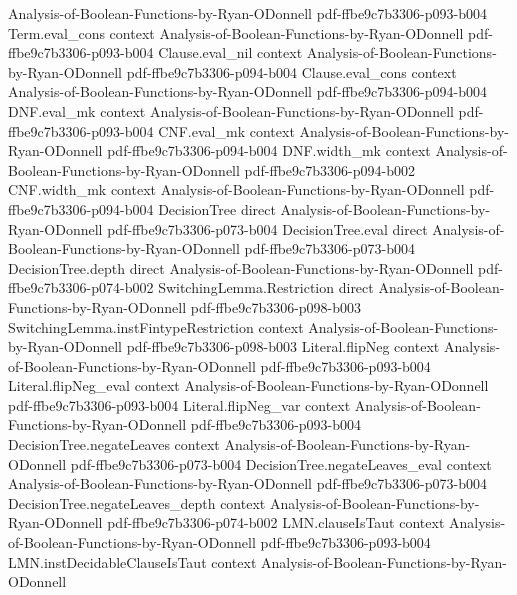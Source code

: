 \begin{theorem}
  {Analysis-of-Boolean-Functions-by-Ryan-ODonnell}
  {pdf-ffbe9c7b3306-p093-b004}
\proofstep
  {Term.eval_cons}
  {context}
  {Analysis-of-Boolean-Functions-by-Ryan-ODonnell}
  {pdf-ffbe9c7b3306-p093-b004}
\proofstep
  {Clause.eval_nil}
  {context}
  {Analysis-of-Boolean-Functions-by-Ryan-ODonnell}
  {pdf-ffbe9c7b3306-p094-b004}
\proofstep
  {Clause.eval_cons}
  {context}
  {Analysis-of-Boolean-Functions-by-Ryan-ODonnell}
  {pdf-ffbe9c7b3306-p094-b004}
\proofstep
  {DNF.eval_mk}
  {context}
  {Analysis-of-Boolean-Functions-by-Ryan-ODonnell}
  {pdf-ffbe9c7b3306-p093-b004}
\proofstep
  {CNF.eval_mk}
  {context}
  {Analysis-of-Boolean-Functions-by-Ryan-ODonnell}
  {pdf-ffbe9c7b3306-p094-b004}
\proofstep
  {DNF.width_mk}
  {context}
  {Analysis-of-Boolean-Functions-by-Ryan-ODonnell}
  {pdf-ffbe9c7b3306-p094-b002}
\proofstep
  {CNF.width_mk}
  {context}
  {Analysis-of-Boolean-Functions-by-Ryan-ODonnell}
  {pdf-ffbe9c7b3306-p094-b004}
\proofstep
  {DecisionTree}
  {direct}
  {Analysis-of-Boolean-Functions-by-Ryan-ODonnell}
  {pdf-ffbe9c7b3306-p073-b004}
\proofstep
  {DecisionTree.eval}
  {direct}
  {Analysis-of-Boolean-Functions-by-Ryan-ODonnell}
  {pdf-ffbe9c7b3306-p073-b004}
\proofstep
  {DecisionTree.depth}
  {direct}
  {Analysis-of-Boolean-Functions-by-Ryan-ODonnell}
  {pdf-ffbe9c7b3306-p074-b002}
\proofstep
  {SwitchingLemma.Restriction}
  {direct}
  {Analysis-of-Boolean-Functions-by-Ryan-ODonnell}
  {pdf-ffbe9c7b3306-p098-b003}
\proofstep
  {SwitchingLemma.instFintypeRestriction}
  {context}
  {Analysis-of-Boolean-Functions-by-Ryan-ODonnell}
  {pdf-ffbe9c7b3306-p098-b003}
\proofstep
  {Literal.flipNeg}
  {context}
  {Analysis-of-Boolean-Functions-by-Ryan-ODonnell}
  {pdf-ffbe9c7b3306-p093-b004}
\proofstep
  {Literal.flipNeg_eval}
  {context}
  {Analysis-of-Boolean-Functions-by-Ryan-ODonnell}
  {pdf-ffbe9c7b3306-p093-b004}
\proofstep
  {Literal.flipNeg_var}
  {context}
  {Analysis-of-Boolean-Functions-by-Ryan-ODonnell}
  {pdf-ffbe9c7b3306-p093-b004}
\proofstep
  {DecisionTree.negateLeaves}
  {context}
  {Analysis-of-Boolean-Functions-by-Ryan-ODonnell}
  {pdf-ffbe9c7b3306-p073-b004}
\proofstep
  {DecisionTree.negateLeaves_eval}
  {context}
  {Analysis-of-Boolean-Functions-by-Ryan-ODonnell}
  {pdf-ffbe9c7b3306-p073-b004}
\proofstep
  {DecisionTree.negateLeaves_depth}
  {context}
  {Analysis-of-Boolean-Functions-by-Ryan-ODonnell}
  {pdf-ffbe9c7b3306-p074-b002}
\proofstep
  {LMN.clauseIsTaut}
  {context}
  {Analysis-of-Boolean-Functions-by-Ryan-ODonnell}
  {pdf-ffbe9c7b3306-p093-b004}
\proofstep
  {LMN.instDecidableClauseIsTaut}
  {context}
  {Analysis-of-Boolean-Functions-by-Ryan-ODonnell}

\end{theorem}
